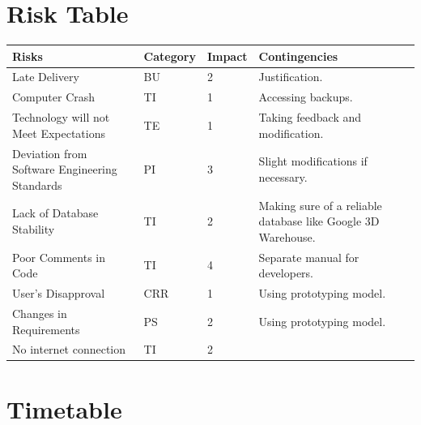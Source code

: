 \documentclass[12pt,a4paper,final,oneside]{report}
\begin{document}
\begin{table}[]\section{Risk Table}
\centering

\label{Risk Table}
\begin{tabular}{|p{3.5cm}| p{2cm} | p{2.3cm} | p{4cm}|}
\hline
Risks                                         & Category  & Impact &Contingencies \\ \hline
Late Delivery                                & BU               & 2   &  Justification. \\ \hline
Computer Crash                                 & TI              & 1 & Accessing backups.   \\ \hline
Technology will not Meet Expectations         & TE            & 1    & Taking feedback and modification. \\ \hline
Deviation from Software Engineering Standards       & PI               & 3  & Slight modifications if necessary.  \\ \hline
Lack of Database Stability                & TI             & 2   &  Making sure of a reliable database like Google 3D Warehouse. \\ \hline
Poor Comments in Code                         & TI              & 4  & Separate manual for developers.   \\ \hline
User’s Disapproval                            & CRR             & 1   & Using prototyping model.  \\ \hline
Changes in Requirements                                & PS             & 2   &  Using prototyping model. \\ \hline
No internet connection                        & TI             & 2  &    \\ \hline
\end{tabular}
\end{table}

\section{ Timetable}
\end{document}
